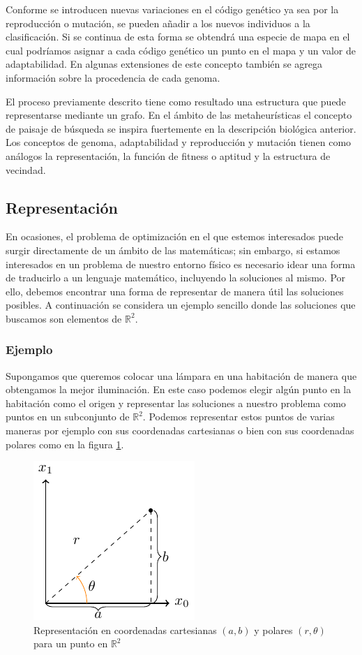 Conforme se introducen nuevas variaciones en el código genético ya sea por la reproducción o mutación, se pueden añadir a los nuevos individuos a la clasificación. 
%
Si se continua de esta forma se obtendrá una especie de mapa en el cual podríamos asignar a cada código genético un punto en el mapa y un valor de adaptabilidad.
%
En algunas extensiones de este concepto también se agrega información sobre la procedencia de cada genoma.

El proceso previamente descrito tiene como resultado una estructura que puede representarse mediante un grafo. 
%
En el ámbito de las metaheurísticas el concepto de paisaje de búsqueda se inspira fuertemente en la descripción biológica anterior. 
%
Los conceptos de genoma, adaptabilidad y reproducción y mutación tienen como análogos la representación, la función de fitness o aptitud y la estructura de vecindad.   

\subsection{Representación}

En ocasiones, el problema de optimización en el que estemos interesados puede surgir directamente de un ámbito de las matemáticas;
%
sin embargo, si estamos interesados en un problema de nuestro entorno físico es necesario idear una forma de traducirlo a un lenguaje matemático, 
incluyendo la soluciones al mismo. 
%
Por ello, debemos encontrar una forma de representar de manera útil las soluciones posibles.
%
A continuación se considera un ejemplo sencillo donde las soluciones que buscamos son elementos de $\mathbb{R}^2$.
\subsubsection*{Ejemplo}
Supongamos que queremos colocar una lámpara en una habitación de manera que obtengamos la mejor iluminación. En este caso podemos elegir algún punto en la habitación como el origen y representar las soluciones a nuestro problema como puntos en un subconjunto de $\mathbb{R}^2$. Podemos representar estos puntos de varias maneras por ejemplo con sus coordenadas cartesianas o bien con sus coordenadas polares como en la figura \ref{fig:cartpol}.

\begin{figure}[H]
    \centering
    \includegraphics[scale=1.5]{Imagenes/repr_example.pdf}
    \caption{Representación en coordenadas cartesianas $(a,b)$ y polares $(r,\theta)$ para un punto  en $\mathbb{R}^2$}
    \label{fig:cartpol}
\end{figure}

